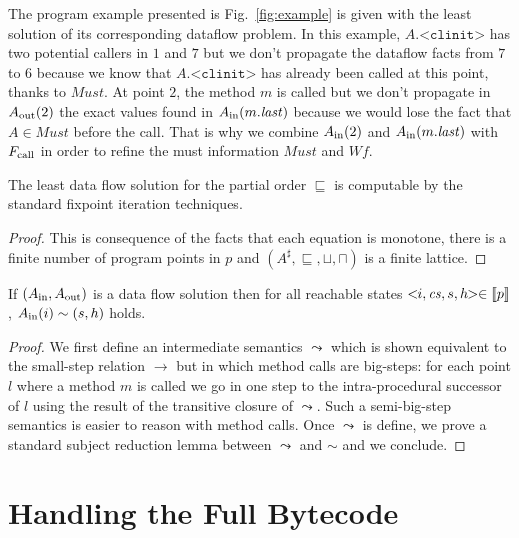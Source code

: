 \documentclass{entcs}
\newcommand{\clinit}{\ensuremath{\texttt{<clinit>}}}
\newcommand{\must}{\ensuremath{\mathit{Must}}}
\newcommand{\wf}{\ensuremath{\mathit{Wf}}}
\begin{document}
The program example presented is Fig.~\ref{fig:example} is given with
the least solution of its corresponding dataflow problem.  In this
example, $A.\clinit$ has two potential callers in $1$ and $7$ but we
don't propagate the dataflow facts from $7$ to $6$ because we know
that $A.\clinit$ has already been called at this point, thanks to
$\must$.  At point $2$, the method $m$ is called but we don't propagate
in $A_{\mathrm{out}}(2)$ the exact values found in $A_{\mathrm{in}}(m.\mathit{last})$ because we
would lose the fact that $A\in\must$ before the call.  That is why we
combine $A_{\mathrm{in}}(2)$ and $A_{\mathrm{in}}(m.\mathit{last})$ with $F_{\mathrm{call}}$ in order to
refine the must information $\must$ and $\wf$.






\begin{theorem}[Computability]
  The least data flow solution for the partial order $\sqsubseteq$ is
  computable by the standard fixpoint iteration techniques.
\end{theorem}
\begin{proof}
  This is consequence of the facts that each equation is monotone,
  there is a finite number of program points in $p$ and
  $(A^\sharp,\sqsubseteq,\sqcup,\sqcap)$ is a finite lattice.
\end{proof}

\begin{theorem}[Soundness]
  If $(A_{\mathrm{in}},A_{\mathrm{out}})$ is a data flow solution then for all reachable
  states $<\!\!i,\mathit{cs},s,h\!\!>\in\llbracket{p}\rrbracket$, $A_{\mathrm{in}}(i)\sim(s,h)$
  holds.
\end{theorem}
\def\proofname{Proof sketch.}
\begin{proof}
  We first define an intermediate semantics $\leadsto$ which is shown
  equivalent to the small-step relation $\to$ but in which method
  calls are big-steps: for each point $l$ where a method $m$ is called
  we go in one step to the intra-procedural successor of $l$ using the
  result of the transitive closure of $\leadsto$.  Such a
  semi-big-step semantics is easier to reason with method calls.
Once $\leadsto$ is define, we prove a standard subject reduction
  lemma between $\leadsto$ and $\sim$ and we conclude.
\end{proof}
\def\proofname{Proof.}


\section{Handling the Full Bytecode}
\label{sec:extensions}
\end{document}
